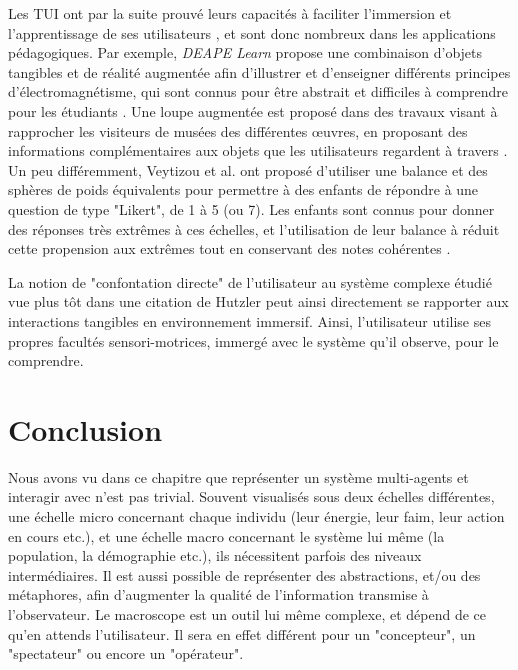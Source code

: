 			Les TUI ont par la suite prouvé leurs capacités à faciliter l'immersion et l'apprentissage de ses utilisateurs \cite{zuckerman_tui_2013, fleck_marker-based_2015, cheng_affordances_2013}, et sont donc nombreux dans les applications pédagogiques. Par exemple, \textit{DEAPE Learn} propose une combinaison d'objets tangibles et de réalité augmentée afin d'illustrer et d'enseigner différents principes d'électromagnétisme, qui sont connus pour être abstrait et difficiles à comprendre pour les étudiants \cite{da_costa_realite_2019}. Une loupe augmentée est proposé dans des travaux visant à rapprocher les visiteurs de musées des différentes œuvres, en proposant des informations complémentaires aux objets que les utilisateurs regardent à travers \cite{damala_loupe_2016}. Un peu différemment, Veytizou et al. ont proposé d'utiliser une balance et des sphères de poids équivalents pour permettre à des enfants de répondre à une question de type "Likert", de 1 à 5 (ou 7). Les enfants sont connus pour donner des réponses très extrêmes à ces échelles, et l'utilisation de leur balance à réduit cette propension aux extrêmes tout en conservant des notes cohérentes \cite{veytizou_could_2018}.
	
	La notion de "confontation directe" de l'utilisateur au système complexe étudié vue plus tôt dans une citation de Hutzler \cite{hutzler_du_2000} peut ainsi directement se rapporter aux interactions tangibles en environnement immersif. Ainsi, l'utilisateur utilise ses propres facultés sensori-motrices, immergé avec le système qu'il observe, pour le comprendre.
	
				
	\section*{Conclusion}
	
		Nous avons vu dans ce chapitre que représenter un système multi-agents et interagir avec n'est pas trivial. Souvent visualisés sous deux échelles différentes, une échelle micro concernant chaque individu (leur énergie, leur faim, leur action en cours etc.), et une échelle macro concernant le système lui même (la population, la démographie etc.), ils nécessitent parfois des niveaux intermédiaires. Il est aussi possible de représenter des abstractions, et/ou des métaphores, afin d'augmenter la qualité de l'information transmise à l'observateur. Le macroscope est un outil lui même complexe, et dépend de ce qu'en attends l'utilisateur. Il sera en effet différent pour un "concepteur", un "spectateur" ou encore un "opérateur".
		
